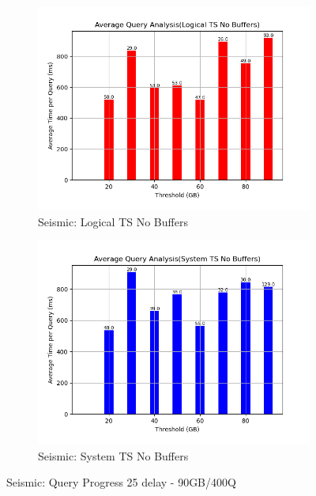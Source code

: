 \begin{figure}
\begin{subfigure}[c]{0.48\textwidth}
	\end{subfigure}
	\begin{subfigure}[c]{0.48\textwidth}
		\includegraphics[width=1\textwidth]	 {figures/Experiments/Dynamic/SEISMIC/batch_answering/25/average_query_time_per_batch_version_999777016_10485760_10_delay[25].png}
		\caption{Seismic: Logical TS No Buffers}
		\label{fig:logical-ts-no-25-seismic}
	\end{subfigure}
	\begin{subfigure}[c]{0.48\textwidth}
		\includegraphics[width=1\textwidth]	 {figures/Experiments/Dynamic/SEISMIC/batch_answering/25/average_query_time_per_batch_version_999777017_10485760_10_delay[25].png}
		\caption{Seismic: System TS No Buffers}
		\label{fig:system-ts-no-25-seismic}
	\end{subfigure}
	\caption{Seismic: Query Progress 25 delay - 90GB/400Q}
	\label{fig:query-progress-25-seismic}
\end{figure}
